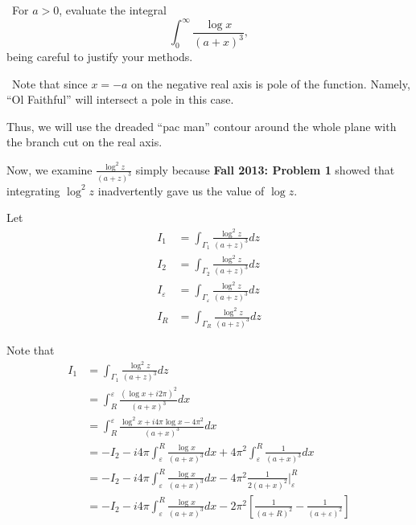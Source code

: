 \documentclass[12pt]{Qual}
\begin{document}
\begin{problem} $\,$
For $a>0$, evaluate the integral $$\int_0^\infty\frac{\log x}{(a+x)^3},$$ being careful to justify your methods.
\end{problem}


\begin{solution}$\,$
Note that since $x=-a$ on the negative real axis is pole of the function. Namely, ``Ol Faithful'' will intersect a pole in this case.

Thus, we will use the dreaded ``pac man'' contour around the whole plane with the branch cut on the real axis.

\begin{center}
\end{center}

Now, we examine $\frac{\log^2z}{(a+z)^3}$ simply because \textbf{Fall 2013: Problem 1} showed that integrating $\log^2z$ inadvertently gave us the value of $\log z$.

Let \begin{align*}
    I_1&=\int_{\Gamma_1}\frac{\log^2 z}{(a+z)^3}dz\\
    I_2&=\int_{\Gamma_2}\frac{\log^2 z}{(a+z)^3}dz\\
    I_\varepsilon&=\int_{\Gamma_\varepsilon}\frac{\log^2 z}{(a+z)^3}dz\\
    I_R&=\int_{\Gamma_R}\frac{\log^2 z}{(a+z)^3}dz
\end{align*}

Note that \begin{align*}
    I_1&=\int_{\Gamma_1}\frac{\log^2 z}{(a+z)^3}dz\\
    &=\int_R^\varepsilon\frac{(\log x+i2\pi)^2}{(a+x)^3}dx\\
    &=\int_R^\varepsilon\frac{\log^2 x+i4\pi\log x-4\pi^2}{(a+x)^3}dx\\
    &=-I_2-i4\pi\int_\varepsilon^R\frac{\log x}{(a+x)^3}dx+4\pi^2\int_\varepsilon^R\frac{1}{(a+x)^3}dx\\
    &=-I_2-i4\pi\int_\varepsilon^R\frac{\log x}{(a+x)^3}dx-4\pi^2\frac{1}{2(a+x)^2}\Big|_\varepsilon^R\\
    &=-I_2-i4\pi\int_\varepsilon^R\frac{\log x}{(a+x)^3}dx-2\pi^2\left[\frac{1}{(a+R)^2}-\frac{1}{(a+\varepsilon)^2}\right]
\end{align*}


\end{solution}
\end{document}
